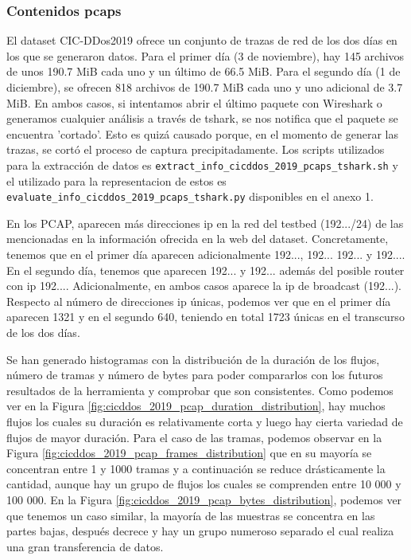 \subsubsection{Contenidos pcaps}

El dataset CIC-DDos2019 ofrece un conjunto de trazas de red de los dos días en los que se generaron datos. Para el primer día (3 de noviembre), hay 145 archivos de unos 190.7 MiB cada uno y un último de 66.5 MiB. Para el segundo día (1 de diciembre), se ofrecen 818 archivos de 190.7 MiB cada uno y uno adicional de 3.7 MiB. En ambos casos, si intentamos abrir el último paquete con Wireshark o generamos cualquier análisis a través de tshark, se nos notifica que el paquete se encuentra 'cortado'. Esto es quizá causado porque, en el momento de generar las trazas, se cortó el proceso de captura precipitadamente. Los scripts utilizados para la extracción de datos es \texttt{extract\_info\_cicddos\_2019\_pcaps\_tshark.sh} y el utilizado para la representacion de estos es \texttt{evaluate\_info\_cicddos\_2019\_pcaps\_tshark.py} disponibles en el anexo 1.

En los PCAP, aparecen más direcciones \acrshort{ip} en la red del testbed (192.../24) de las mencionadas en la información ofrecida en la web del dataset. Concretamente, tenemos que en el primer día aparecen adicionalmente 192..., 192... 192... y 192.... En el segundo día, tenemos que aparecen 192... y 192... además del posible router con \acrshort{ip} 192.... Adicionalmente, en ambos casos aparece la \acrshort{ip} de broadcast (192...). Respecto al número de direcciones \acrshort{ip} únicas, podemos ver que en el primer día aparecen 1321 y en el segundo 640, teniendo en total 1723 únicas en el transcurso de los dos días. 

Se han generado histogramas con la distribución de la duración de los flujos, número de tramas y número de bytes para poder compararlos con los futuros resultados de la herramienta y comprobar que son consistentes. Como podemos ver en la Figura \ref{fig:cicddos_2019_pcap_duration_distribution}, hay muchos flujos los cuales su duración es relativamente corta y luego hay cierta variedad de flujos de mayor duración. Para el caso de las tramas, podemos observar en la Figura \ref{fig:cicddos_2019_pcap_frames_distribution} que en su mayoría se concentran entre 1 y 1000 tramas y a continuación se reduce drásticamente la cantidad, aunque hay un grupo de flujos los cuales se comprenden entre 10 000 y 100 000. En la Figura \ref{fig:cicddos_2019_pcap_bytes_distribution}, podemos ver que tenemos un caso similar, la mayoría de las muestras se concentra en las partes bajas, después decrece y hay un grupo numeroso separado el cual realiza una gran transferencia de datos.

